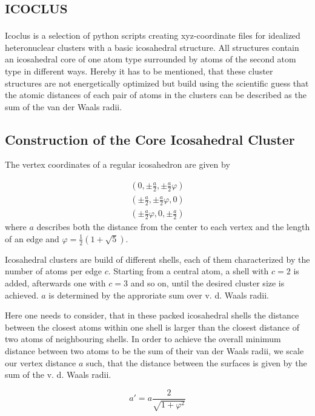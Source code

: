 \section{\textsc{icoclus}}

Icoclus is a selection of python scripts creating xyz-coordinate
files for idealized heteronuclear clusters with a basic
icosahedral structure.
All structures contain an icosahedral core of one atom type
surrounded by atoms of the second atom type in different ways.
Hereby it has to be mentioned, that these cluster structures are not
energetically optimized but build using the scientific guess
that the atomic distances of each pair of atoms in the clusters
can be described as the sum of the van der Waals
radii.

\subsection{Construction of the Core Icosahedral Cluster}
The vertex coordinates of a regular icosahedron are given by

\begin{align}
  \left(  0 , \pm \frac a2 ,  \pm\frac a2 \varphi \right) \nonumber\\
  \left(  \pm\frac a2 , \pm \frac a2 \varphi ,  0 \right) \nonumber\\
  \left(  \pm \frac a2 \varphi , 0 ,  \pm\frac a2 \right)
\end{align}
where $a$ describes both the distance from the center to each vertex
and the length of an edge and $\varphi = \frac 12 (1+\sqrt{5})$.

Icosahedral clusters are build of different shells, each of them
characterized by the number of atoms per edge $c$. Starting from a
central atom, a shell with $c=2$ is added, afterwards one with $c=3$
and so on, until the desired cluster size is achieved.
$a$ is determined by the approriate sum over v. d. Waals radii.

Here one needs to consider, that in these packed icosahedral shells
the distance between the closest atoms within one shell is
larger than the closest distance of two atoms of neighbouring shells.
In order to achieve the overall minimum distance between two atoms
to be the sum of their van der Waals radii, we scale our vertex
distance $a$ such, that the distance between the surfaces is given by
the sum of the v. d. Waals radii.

\begin{equation}
 a' = a \frac{2}{\sqrt{1+\varphi^2}}
\end{equation}

